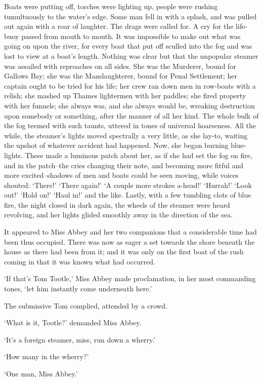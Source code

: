 Boats were putting off, torches were lighting up, people were rushing
tumultuously to the water’s edge. Some man fell in with a splash, and
was pulled out again with a roar of laughter. The drags were called for.
A cry for the life-buoy passed from mouth to mouth. It was impossible to
make out what was going on upon the river, for every boat that put off
sculled into the fog and was lost to view at a boat’s length. Nothing
was clear but that the unpopular steamer was assailed with reproaches
on all sides. She was the Murderer, bound for Gallows Bay; she was the
Manslaughterer, bound for Penal Settlement; her captain ought to be
tried for his life; her crew ran down men in row-boats with a relish;
she mashed up Thames lightermen with her paddles; she fired property
with her funnels; she always was, and she always would be, wreaking
destruction upon somebody or something, after the manner of all her
kind. The whole bulk of the fog teemed with such taunts, uttered in
tones of universal hoarseness. All the while, the steamer’s lights moved
spectrally a very little, as she lay-to, waiting the upshot of whatever
accident had happened. Now, she began burning blue-lights. These made a
luminous patch about her, as if she had set the fog on fire, and in the
patch--the cries changing their note, and becoming more fitful and more
excited--shadows of men and boats could be seen moving, while voices
shouted: ‘There!’ ‘There again!’ ‘A couple more strokes a-head!’
‘Hurrah!’ ‘Look out!’ ‘Hold on!’ ‘Haul in!’ and the like. Lastly, with
a few tumbling clots of blue fire, the night closed in dark again,
the wheels of the steamer were heard revolving, and her lights glided
smoothly away in the direction of the sea.

It appeared to Miss Abbey and her two companions that a considerable
time had been thus occupied. There was now as eager a set towards the
shore beneath the house as there had been from it; and it was only
on the first boat of the rush coming in that it was known what had
occurred.

‘If that’s Tom Tootle,’ Miss Abbey made proclamation, in her most
commanding tones, ‘let him instantly come underneath here.’

The submissive Tom complied, attended by a crowd.

‘What is it, Tootle?’ demanded Miss Abbey.

‘It’s a foreign steamer, miss, run down a wherry.’

‘How many in the wherry?’

‘One man, Miss Abbey.’

